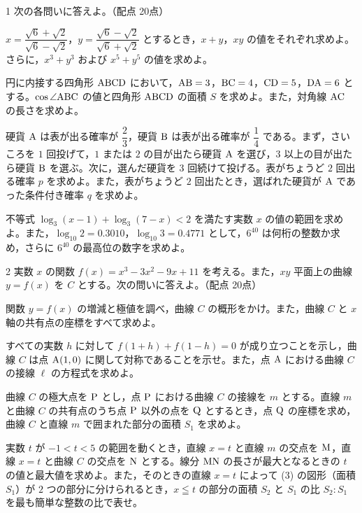 \begin{monsheet}

\begin{daimon}{1}
次の各問いに答えよ。\hfill（配点 20点）
\begin{shomon}
  \item $x=\dfrac{\sqrt{6}+\sqrt{2}}{\sqrt{6}-\sqrt{2}}$，$y=\dfrac{\sqrt{6}-\sqrt{2}}{\sqrt{6}+\sqrt{2}}$ とするとき，$x+y$，$xy$ の値をそれぞれ求めよ。さらに，$x^{3}+y^{3}$ および $x^{5}+y^{5}$ の値を求めよ。
  \item 円に内接する四角形 $\mathrm{ABCD}$ において，$\mathrm{AB}=3$，$\mathrm{BC}=4$，$\mathrm{CD}=5$，$\mathrm{DA}=6$ とする。$\cos\angle\mathrm{ABC}$ の値と四角形 $\mathrm{ABCD}$ の面積 $S$ を求めよ。また，対角線 $\mathrm{AC}$ の長さを求めよ。
  \item 硬貨 $\mathrm{A}$ は表が出る確率が $\dfrac{2}{3}$，硬貨 $\mathrm{B}$ は表が出る確率が $\dfrac{1}{4}$ である。まず，さいころを $1$ 回投げて，$1$ または $2$ の目が出たら硬貨 $\mathrm{A}$ を選び，$3$ 以上の目が出たら硬貨 $\mathrm{B}$ を選ぶ。次に，選んだ硬貨を $3$ 回続けて投げる。表がちょうど $2$ 回出る確率 $p$ を求めよ。また，表がちょうど $2$ 回出たとき，選ばれた硬貨が $\mathrm{A}$ であった条件付き確率 $q$ を求めよ。
  \item 不等式 $\log_{3}(x-1)+\log_{3}(7-x)<2$ を満たす実数 $x$ の値の範囲を求めよ。また，$\log_{10}2=0.3010$，$\log_{10}3=0.4771$ として，$6^{40}$ は何桁の整数か求め，さらに $6^{40}$ の最高位の数字を求めよ。
\end{shomon}
\end{daimon}

\begin{daimon}{2}
実数 $x$ の関数 $f(x)=x^{3}-3x^{2}-9x+11$ を考える。また，$xy$ 平面上の曲線 $y=f(x)$ を $C$ とする。次の問いに答えよ。\hfill（配点 20点）
\begin{shomon}
  \item 関数 $y=f(x)$ の増減と極値を調べ，曲線 $C$ の概形をかけ。また，曲線 $C$ と $x$ 軸の共有点の座標をすべて求めよ。
  \item すべての実数 $h$ に対して $f(1+h)+f(1-h)=0$ が成り立つことを示し，曲線 $C$ は点 $\mathrm{A}(1, 0)$ に関して対称であることを示せ。また，点 $\mathrm{A}$ における曲線 $C$ の接線 $\ell$ の方程式を求めよ。
  \item 曲線 $C$ の極大点を $\mathrm{P}$ とし，点 $\mathrm{P}$ における曲線 $C$ の接線を $m$ とする。直線 $m$ と曲線 $C$ の共有点のうち点 $\mathrm{P}$ 以外の点を $\mathrm{Q}$ とするとき，点 $\mathrm{Q}$ の座標を求め，曲線 $C$ と直線 $m$ で囲まれた部分の面積 $S_{1}$ を求めよ。
  \item 実数 $t$ が $-1<t<5$ の範囲を動くとき，直線 $x=t$ と直線 $m$ の交点を $\mathrm{M}$，直線 $x=t$ と曲線 $C$ の交点を $\mathrm{N}$ とする。線分 $\mathrm{MN}$ の長さが最大となるときの $t$ の値と最大値を求めよ。また，そのときの直線 $x=t$ によって (3) の図形（面積 $S_{1}$）が $2$ つの部分に分けられるとき，$x\leqq t$ の部分の面積 $S_{2}$ と $S_{1}$ の比 $S_{2}:S_{1}$ を最も簡単な整数の比で表せ。
\end{shomon}
\end{daimon}


\end{monsheet}
